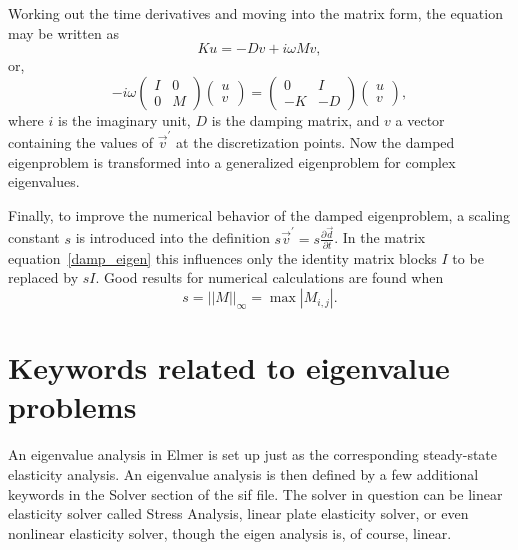 \begin{versiona}
Working out the time derivatives and moving into the matrix form, the
equation may be written as
\begin{equation}
Ku=-Dv+i\omega Mv,
\end{equation}
or,
\begin{equation}
\label{damp_eigen}
-i\omega\left(\begin{array}{cc}
I & 0 \\ 0 & M \end{array}\right) \left(\begin{array}{c}
u \\ v \end{array} \right) = \left(\begin{array}{cc}
0 & I \\ -K & -D \end{array}\right) \left(\begin{array}{c}
u \\ v\end{array} \right),
\end{equation}
where $i$ is the imaginary unit, $D$ is the damping matrix, and $v$ a
vector containing the values of $\vec{v}^{\prime}$ at the
discretization points. Now the damped eigenproblem is transformed into
a generalized eigenproblem for complex eigenvalues.

Finally, to improve the numerical behavior of the damped eigenproblem,
a scaling constant $s$ is introduced into the definition
$s\vec{v}^{\prime}=s\frac{\partial \vec{d}}{\partial t}$. In the
matrix equation~\ref{damp_eigen} this influences only the identity
matrix blocks $I$ to be replaced by $sI$. Good results for numerical
calculations are found when 
\begin{equation}
s = ||M||_\infty = \max |M_{i,j}|.
\end{equation}



\section{Keywords related to eigenvalue problems}

\end{versiona}

An eigenvalue analysis in Elmer is set up just as the corresponding
steady-state elasticity analysis. An eigenvalue analysis is then
defined by a few additional keywords in the Solver section of the sif
file. The solver in question can be linear elasticity solver called
Stress Analysis, linear plate elasticity solver, or even nonlinear
elasticity solver, though the eigen analysis is, of course,
linear. 

